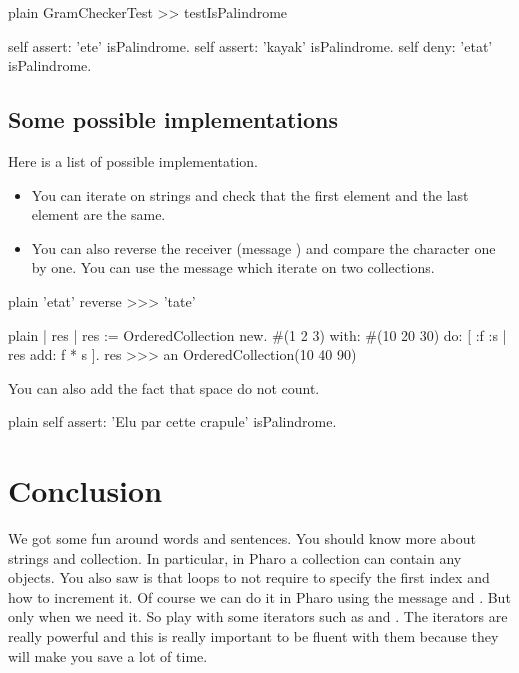 \documentclass[10pt,twoside,english]{_support/latex/sbabook/sbabook}
\begin{document}
\begin{displaycode}{plain}
GramCheckerTest >> testIsPalindrome

	self assert: 'ete' isPalindrome.
	self assert: 'kayak' isPalindrome.
	self deny: 'etat' isPalindrome.
\end{displaycode}
\subsection{Some possible implementations}
Here is a list of possible implementation.

\begin{itemize}
\item You can iterate on strings and check that the first element and the last element are the same. 
\item You can also reverse the receiver (message ) and compare the character one by one. You can use the message  which iterate on two collections. 
\end{itemize}

\begin{displaycode}{plain}
'etat' reverse 
>>> 'tate'
\end{displaycode}

\begin{displaycode}{plain}
| res |
res := OrderedCollection new. 
#(1 2 3) with: #(10 20 30) do: [ :f :s | res add: f * s ].
res
>>> an OrderedCollection(10 40 90)
\end{displaycode}

You can also add the fact that space do not count. 

\begin{displaycode}{plain}
	self assert: 'Elu par cette crapule' isPalindrome.
\end{displaycode}
\section{Conclusion}
We got some fun around words and sentences. You should know more about strings and collection. In particular, in Pharo a collection can contain any objects. You also saw is that loops to not require to specify the first index and how to increment it. Of course we can do it in Pharo using the message  and . But only when we need it. So play with some iterators such as  and . The iterators are really powerful and this is really important to be fluent with them because they will make you save a lot of time. 


\backmatter



\end{document}
